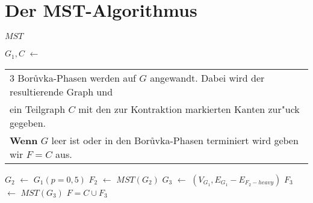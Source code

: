 \section{Der MST-Algorithmus}
\begin{algorithm}
$MST$\\
\begin{algorithmic}[1]
    \STATE $G_1, C$ $\leftarrow$\begin{tabular}[H]{l}
                                 3 Bor\r uvka-Phasen werden auf $G$ angewandt.
                                 Dabei wird der resultierende Graph und\\
                                 ein Teilgraph $C$ mit den zur
                                 Kontraktion markierten Kanten zur"uck gegeben.\\
                                 \textbf{Wenn} $G$ leer ist oder in den Bor\r uvka-Phasen
                                 terminiert wird geben wir $F=C$ aus.\\
                                 \end{tabular}
    \STATE $G_2$ $\leftarrow$ $G_1(p=0,5)$
    \STATE $F_2$ $\leftarrow$ $MST(G_2)$
    \STATE $G_3$ $\leftarrow$ $(V_{G_1}, E_{G_1} - E_{F_2-heavy})$
    \STATE $F_3$ $\leftarrow$ $MST(G_3)$
    \RETURN $F = C \cup F_3$
\end{algorithmic}
\end{algorithm}

